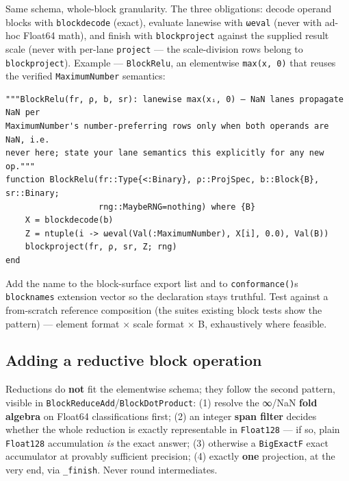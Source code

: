 \label{15527859041760837550}{}


Same schema, whole-block granularity. The three obligations: decode operand blocks with \texttt{blockdecode} (exact), evaluate lanewise with \texttt{ωeval} (never with ad-hoc Float64 math), and finish with \texttt{blockproject} against the supplied result scale (never with per-lane \texttt{project} — the scale-division rows belong to \texttt{blockproject}). Example — \texttt{BlockRelu}, an elementwise \texttt{max(x, 0)} that reuses the verified \texttt{MaximumNumber} semantics:




\begin{verbatim}
"""BlockRelu(fr, ρ, b, sr): lanewise max(xᵢ, 0) — NaN lanes propagate NaN per
MaximumNumber's number-preferring rows only when both operands are NaN, i.e.
never here; state your lane semantics this explicitly for any new op."""
function BlockRelu(fr::Type{<:Binary}, ρ::ProjSpec, b::Block{B}, sr::Binary;
                   rng::MaybeRNG=nothing) where {B}
    X = blockdecode(b)
    Z = ntuple(i -> ωeval(Val(:MaximumNumber), X[i], 0.0), Val(B))
    blockproject(fr, ρ, sr, Z; rng)
end
\end{verbatim}



Add the name to the block-surface export list and to \texttt{conformance()}{\textquotesingle}s \texttt{blocknames} extension vector so the declaration stays truthful. Test against a from-scratch reference composition (the suite{\textquotesingle}s existing block tests show the pattern) — element format × scale format × B, exhaustively where feasible.



\subsection{Adding a reductive block operation}



\label{9686810033048460081}{}


Reductions do \textbf{not} fit the elementwise schema; they follow the second pattern, visible in \texttt{BlockReduceAdd}/\texttt{BlockDotProduct}: (1) resolve the ∞/NaN \textbf{fold algebra} on Float64 classifications first; (2) an integer \textbf{span filter} decides whether the whole reduction is exactly representable in \texttt{Float128} — if so, plain \texttt{Float128} accumulation \emph{is} the exact answer; (3) otherwise a \texttt{BigExactF} exact accumulator at provably sufficient precision; (4) exactly \textbf{one} projection, at the very end, via \texttt{\_finish}. Never round intermediates.



